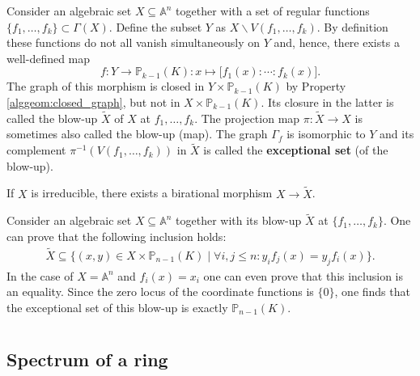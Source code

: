     \begin{construct}[Blow-up]
        Consider an algebraic set $X\subseteq\mathbb{A}^n$ together with a set of regular functions $\{f_1,\ldots,f_k\}\subset\Gamma(X)$. Define the subset $Y$ as $X\backslash V(f_1,\ldots,f_k)$. By definition these functions do not all vanish simultaneously on $Y$ and, hence, there exists a well-defined map \[f:Y\rightarrow \mathbb{P}_{k-1}(K):x\mapsto\Big[f_1(x):\cdots:f_k(x)\Big].\] The graph of this morphism is closed in $Y\times\mathbb{P}_{k-1}(K)$ by Property \ref{alggeom:closed_graph}, but not in $X\times\mathbb{P}_{k-1}(K)$. Its closure in the latter is called the blow-up $\widetilde{X}$ of $X$ at $f_1,\ldots,f_k$. The projection map $\pi:\widetilde{X}\rightarrow X$ is sometimes also called the blow-up (map). The graph $\Gamma_f$ is isomorphic to $Y$ and its complement $\pi^{-1}(V(f_1,\ldots,f_k))$ in $\widetilde{X}$ is called the \textbf{exceptional set} (of the blow-up).

        If $X$ is irreducible, there exists a birational morphism $X\rightarrow\widetilde{X}$.
    \end{construct}
    \begin{property}
        Consider an algebraic set $X\subseteq\mathbb{A}^n$ together with its blow-up $\widetilde{X}$ at $\{f_1,\ldots,f_k\}$. One can prove that the following inclusion holds:
        \begin{gather}
            \widetilde{X}\subseteq\{(x,y)\in X\times\mathbb{P}_{n-1}(K)\mid\forall i,j\leq n:y_if_j(x)=y_jf_i(x)\}.
        \end{gather}
        In the case of $X=\mathbb{A}^n$ and $f_i(x)=x_i$ one can even prove that this inclusion is an equality. Since the zero locus of the coordinate functions is $\{0\}$, one finds that the exceptional set of this blow-up is exactly $\mathbb{P}_{n-1}(K)$.
    \end{property}

\section{}\label{section:schemes}
\subsection{Spectrum of a ring}


